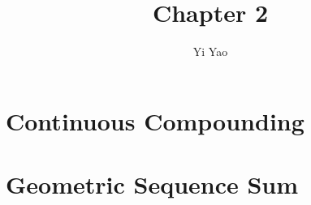 \documentclass{article}
\title{Chapter 2}
\author{Yi Yao}
\begin{document}
    \maketitle
    \section{Continuous Compounding}
    
    \section{Geometric Sequence Sum}
    
\end{document}
